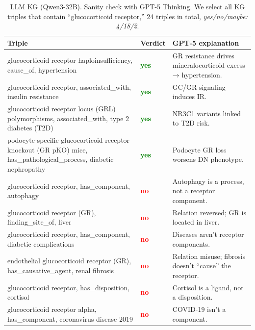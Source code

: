 \documentclass[10pt]{article}
\begin{document}
\begin{appendices}
\begin{table}[t]
\centering
\caption{LLM KG (Qwen3-32B). Sanity check with GPT-5 Thinking. We select all KG triples that contain ``glucocorticoid receptor,'' 24 triples in total, \emph{yes/no/maybe: 4/18/2}.}
\label{tab:llm_triples-check-glucocorticoid}
\begin{tabularx}{\linewidth}{
  >{\hsize=1.2\hsize\raggedright\arraybackslash}X  %
  p{3em}                                           %
  >{\hsize=0.8\hsize\raggedright\arraybackslash}X  %
}
\rowcolor{gray!30}
\textbf{Triple} & \textbf{Verdict} & \textbf{GPT-5 explanation} \\
\midrule
glucocorticoid receptor haploinsufficiency, cause\_of, hypertension & \textcolor{Green}{\bf yes} & GR resistance drives mineralocorticoid excess → hypertension. \\
glucocorticoid receptor, associated\_with, insulin resistance & \textcolor{Green}{\bf yes} & GC/GR signaling induces IR. \\
glucocorticoid receptor locus (GRL) polymorphisms, associated\_with, type 2 diabetes (T2D) & \textcolor{Green}{\bf yes} & NR3C1 variants linked to T2D risk. \\
podocyte-specific glucocorticoid receptor knockout (GR pKO) mice, has\_pathological\_process, diabetic nephropathy & \textcolor{Green}{\bf yes} & Podocyte GR loss worsens DN phenotype. \\
glucocorticoid receptor, has\_component, autophagy & \textcolor{red}{\bf no} & Autophagy is a process, not a receptor component. \\
glucocorticoid receptor (GR), finding\_site\_of, liver & \textcolor{red}{\bf no} & Relation reversed; GR is located in liver. \\
glucocorticoid receptor, has\_component, diabetic complications & \textcolor{red}{\bf no} & Diseases aren’t receptor components. \\
endothelial glucocorticoid receptor (GR), has\_causative\_agent, renal fibrosis & \textcolor{red}{\bf no} & Relation misuse; fibrosis doesn’t “cause” the receptor. \\
glucocorticoid receptor, has\_disposition, cortisol & \textcolor{red}{\bf no} & Cortisol is a ligand, not a disposition. \\
glucocorticoid receptor alpha, has\_component, coronavirus disease 2019 & \textcolor{red}{\bf no} & COVID-19 isn’t a component. \\

\end{tabularx}
\end{table}
\end{appendices}
\end{document}
